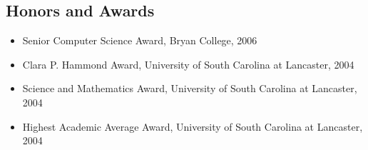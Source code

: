 \documentclass[overlapped,line,letterpaper]{res}
\begin{document}
\begin{resume}


%


%


%


\section{\bf Honors and Awards}
\begin{itemize}
\item Senior Computer Science Award, Bryan College, 2006 
\item Clara P. Hammond Award, University of South Carolina at Lancaster, 2004
\item Science and Mathematics Award, University of South Carolina at Lancaster, 2004
\item Highest Academic Average Award, University of South Carolina at Lancaster, 2004
\end{itemize}


\end{resume}
\end{document}
